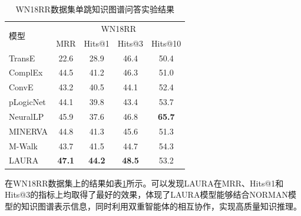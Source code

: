 \documentclass[algorithmlist, AutoFakeBold, AutoFakeSlant, figurelist, tablelist, nomlist, engineering]{seuthesix}
\begin{document}
\begin{table}[t]
  \centering
  \caption{WN18RR数据集单跳知识图谱问答实验结果}
  \begin{tabular*}{0.95\textwidth}{@{\extracolsep{\fill}}lcccc}
    \toprule[1pt]
    \multirow{2}{*}{模型} & \multicolumn{4}{c}{WN18RR}   \\
      & MRR & Hits@1 & Hits@3 & Hits@10 \\ \hline
    TransE & 22.6 & 28.9 & 46.4 & 50.4 \\
    ComplEx & 44.5 & 41.2 & 46.3 & 51.0 \\
    ConvE & 43.2 & 40.5 & 44.1 & 52.4 \\
    pLogicNet & 44.1 & 39.8 & 43.4 & 53.7 \\
    NeuralLP & 45.9 & 37.6 & 46.8 & \textbf{65.7} \\
    MINERVA & 44.8 & 41.3 & 45.6 & 51.3 \\
    M-Walk & 43.7 & 41.5 & 44.7 & 54.3 \\
    LAURA & \textbf{47.1} & \textbf{44.2} & \textbf{48.5} & 53.2 \\
    \bottomrule[1pt]
  \end{tabular*}
  \label{Experiment2_WN18RR}
\end{table}
在WN18RR数据集上的结果如表\ref{Experiment2_WN18RR}所示。可以发现LAURA在MRR、Hits@1和Hits@3的指标上均取得了最好的效果，体现了LAURA模型能够结合NORMAN模型的知识图谱表示信息，同时利用双重智能体的相互协作，实现高质量知识推理。
\end{document}
